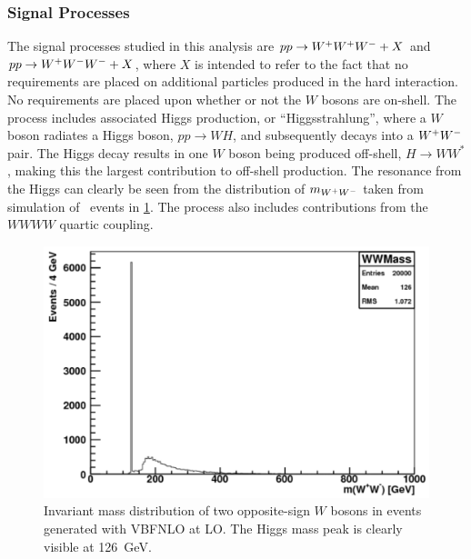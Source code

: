 \subsubsection{Signal Processes}
\label{sec:signal}
The signal processes studied in this analysis 
are  $pp\rightarrow\- W^{+}W^{+}W^{-}+X$ and $pp\rightarrow W^{+}W^{-}W^{-}\allowbreak +X$, 
where $X$ is intended to refer to the fact that
no requirements are placed on additional particles produced in the hard
interaction.
No requirements are placed upon whether or not the $W$ bosons are on-shell.
The process includes associated Higgs production, 
or ``Higgsstrahlung'', where a $W$ boson radiates a Higgs boson,
$pp\rightarrow WH$, and subsequently decays into a $W^{+}W^{-}$ pair.
The Higgs decay results in one $W$ boson being produced off-shell,
$H\rightarrow WW^*$, making this the largest contribution to off-shell
production.  The resonance from the Higgs can clearly be seen from the 
distribution of $m_{W^{+}W^{-}}$ taken from simulation of \www~events
in \fig\ref{fig:mww_higgs}.
The \www process also includes contributions from 
the $WWWW$ quartic coupling. %

\begin{figure}[ht]
\centering
\includegraphics[width=0.5\columnwidth]{figures/2l2j/mWW-parton.pdf}
\caption{ Invariant mass distribution of two opposite-sign $W$ bosons 
in \www events generated with VBFNLO at LO. The Higgs mass peak is clearly 
visible at 126~GeV.}

\label{fig:mww_higgs}
\end{figure}




